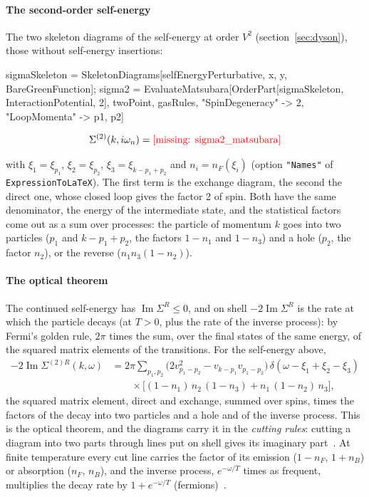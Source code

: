\documentclass[11pt,a4paper]{article}
\newcommand{\formula}[1]{\IfFileExists{figures/formula_#1.tex}{}{\text{\textcolor{red}{[missing: \detokenize{#1}]}}}}
\newcommand{\formulasplit}[1]{\IfFileExists{figures/formula_#1_split.tex}{}{\formula{#1}}}
\newcommand{\pkg}[1]{\texttt{#1}}
\begin{document}
\paragraph{The second-order self-energy} The two skeleton diagrams of the self-energy at order $V^2$
(section~\ref{sec:dyson}), those without self-energy insertions:
\begin{code}
sigmaSkeleton = SkeletonDiagrams[selfEnergyPerturbative, {x, y}, {BareGreenFunction}];
sigma2 = EvaluateMatsubara[OrderPart[sigmaSkeleton, InteractionPotential, 2],
    twoPoint, gasRules, "SpinDegeneracy" -> 2, "LoopMomenta" -> {p1, p2}]
\end{code}
\begin{outputbox}
\vspace{-6pt}
\begin{gather*}
\Sigma^{(2)}(k,i\omega_n)=\formulasplit{sigma2_matsubara}
\end{gather*}
\end{outputbox}
with $\xi_1=\xi_{p_1}$, $\xi_2=\xi_{p_2}$, $\xi_3=\xi_{k-p_1+p_2}$ and $n_i=n_F(\xi_i)$ (option \pkg{"Names"} of
\pkg{ExpressionToLaTeX}). The first term is the exchange diagram, the second the direct one, whose closed loop gives the
factor 2 of spin. Both have the same denominator, the energy of the intermediate state, and the statistical factors come
out as a sum over processes: the particle of momentum $k$ goes into two particles ($p_1$ and $k-p_1+p_2$, the factors
$1-n_1$ and $1-n_3$) and a hole ($p_2$, the factor $n_2$), or the reverse ($n_1n_3(1-n_2)$).

\paragraph{The optical theorem} The continued self-energy has $\operatorname{Im}\Sigma^R\le0$, and on shell
$-2\operatorname{Im}\Sigma^R$ is the rate at which the particle decays (at $T>0$, plus the rate of the inverse process):
by Fermi's golden rule, $2\pi$ times the sum, over the final states of the same energy, of the squared matrix elements
of the transitions. For the self-energy above,
\begin{align*}
-2\operatorname{Im}\Sigma^{(2)R}(k,\omega)&=2\pi\sum_{p_1,p_2}\bigl(2v_{p_1-p_2}^2-v_{k-p_1}v_{p_1-p_2}\bigr)\,
\delta(\omega-\xi_1+\xi_2-\xi_3)\\
&\qquad\times\bigl[(1-n_1)\,n_2\,(1-n_3)+n_1\,(1-n_2)\,n_3\bigr],
\end{align*}
the squared matrix element, direct and exchange, summed over spins, times the factors of the decay into two particles and
a hole and of the inverse process. This is the optical
theorem, and the diagrams carry it in the \emph{cutting rules}: cutting a diagram into two parts through lines put on shell
gives its imaginary part~\cite{Cutkosky1960}. At finite temperature every cut line carries the factor of its emission
($1-n_F$, $1+n_B$) or absorption ($n_F$, $n_B$), and the inverse process, $e^{-\omega/T}$ times as frequent, multiplies the
decay rate by $1+e^{-\omega/T}$ (fermions)~\cite{Weldon1983,KobesSemenoff1985,KobesSemenoff1986,LandsmanVanWeert1987,LeBellac1996,KapustaGale2006}.
\end{document}
